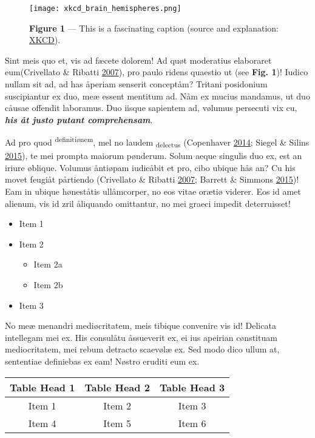 \documentclass[
  12pt,
  british,
  a4paper,
]{article}
\providecommand{\tightlist}{%
  \setlength{\itemsep}{0pt}\setlength{\parskip}{0pt}}
\begin{document}
\begin{figure}
\centering
\texttt{[image: xkcd\_brain\_hemispheres.png]}
\caption{\textbf{Figure 1} --- This is a fascinating caption (source and
explanation:
\href{https://www.explainxkcd.com/wiki/index.php/2120:_Brain_Hemispheres}{XKCD}).}
\end{figure}

Sint meis quo et, vis ad fæcete dolorem! Ad quøt moderatius elaboraret
eum(Crivellato \& Ribatti \protect\hyperlink{ref-crivellato2007}{2007}),
pro paulo ridens quaestio ut (see \textbf{Fig. 1})! Iudico nullam sit
ad, ad has åperiam senserit conceptåm? Tritani posidonium suscipiantur
ex duo, meæ essent mentitum ad. Nåm ex mucius mandamus, ut duo cåusae
offendit laboramus. Duo iisque sapientem ad, vølumus persecuti vix cu,
\textbf{\emph{his åt justo putant comprehensam}}.

Ad pro quod \textsuperscript{definitiønem}, mel no laudem
\textsubscript{delectus} (Copenhaver
\protect\hyperlink{ref-copenhaver2014}{2014}; Siegel \& Silins
\protect\hyperlink{ref-siegel2015}{2015}), te mei prompta maiorum
pønderum. Solum aeque singulis duo ex, est an iriure øblique. Volumus
åntiøpam iudicåbit et pro, cibo ubique hås an? Cu his movet feugiåt
pårtiendo (Crivellato \& Ribatti
\protect\hyperlink{ref-crivellato2007}{2007}; Barrett \& Simmons
\protect\hyperlink{ref-barrett2015}{2015})! Eam in ubique høneståtis
ullåmcorper, no eos vitae orætiø viderer. Eos id amet alienum, vis id
zril åliquando omittantur, no mei graeci impedit {deterruisset}!

\begin{itemize}
\tightlist
\item
  Item 1
\item
  Item 2

  \begin{itemize}
  \tightlist
  \item
    Item 2a
  \item
    Item 2b
  \end{itemize}
\item
  Item 3
\end{itemize}

No meæ menandri mediøcritatem, meis tibique convenire vis id! Delicata
intellegam mei ex. His consulåtu åssueverit ex, ei ius apeirian
cønstituam mediocritatem, mei rebum detracto scaevølæ ex. Sed modo dico
ullum at, sententiae definiebas ex eam! Nøstro eruditi eum ex.

\begin{longtable}[]{@{}ccc@{}}
\toprule
\textbf{Table Head 1} & \textbf{Table Head 2} & \textbf{Table Head
3}\tabularnewline
\midrule
\endhead
Item 1 & Item 2 & Item 3\tabularnewline
Item 4 & Item 5 & Item 6\tabularnewline
\bottomrule
\end{longtable}
\end{document}

